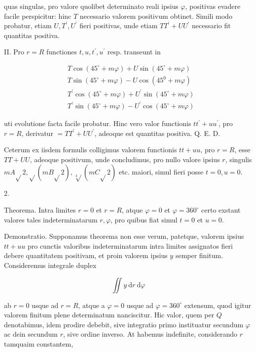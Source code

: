 \documentclass[twoside,12pt, showframe]{memoir}
\begin{document}
quas singulas, pro valore quolibet determinato reali ipsius \(\varphi\), positivas evadere facile perspicitur: hinc \(T\) necessario valorem positivum obtinet. Simili modo probatur, etiam \(U, T^{\prime}, U^{\prime}\) fieri positivas, unde etiam \(T T^{\prime}+U U^{\prime}\) necessario fit quantitas positiva.

II. Pro \(r=R\) functiones \(t, u, t^{\prime}, u^{\prime}\) resp. transeunt in

\[
\begin{aligned}
& T \cos \left(45^{\circ}+m \varphi\right)+U \sin \left(45^{\circ}+m \varphi\right) \\
& T \sin \left(45^{\circ}+m \varphi\right)-U \cos \left(45^{0}+m \varphi\right) \\
& T^{\prime} \cos \left(45^{\circ}+m \varphi\right)+U^{\prime} \sin \left(45^{\circ}+m \varphi\right) \\
& T^{\prime} \sin \left(45^{\circ}+m \varphi\right)-U^{\prime} \cos \left(45^{\circ}+m \varphi\right)
\end{aligned}
\]

uti evolutione facta facile probatur. Hinc vero valor functionis \(t t^{\prime}+u u^{\prime}\), pro \(r=R\), derivatur \(=T T^{\prime}+U U^{\prime}\), adeoque est quantitas positiva. Q. E. D.

Ceterum ex iisdem formulis colligimus valorem functionis \(t t+u u\), pro \(r=R\), esse \(T T+U U\), adeoque positivum, unde concludimus, pro nullo valore ipsius \(r\), singulis \(m A \sqrt{ } 2, \sqrt{ }(m B \sqrt{ } 2), \sqrt[3]{ }(m C \sqrt{ } 2)\) etc. maiori, simul fieri posse \(t=0, u=0\).

2.

Theorema. Intra limites \(r=0\) et \(r=R\), atque \(\varphi=0\) et \(\varphi=360^{\circ}\) certo exstant valores tales indeterminatarum \(r, \varphi\), pro quibus fiat simul \(t=0\) et \(u=0\).

Demonstratio. Supponamus theorema non esse verum, patetque, valorem ipsius \(t t+u u\) pro cunctis valoribus indeterminatarum intra limites assignatos fieri debere quantitatem positivam, et proin valorem ipsius \(y\) semper finitum. Consideremus integrale duplex

\[
\iint y \mathrm{~d} r \mathrm{~d} \varphi
\]

ab \(r=0\) usque ad \(r=R\), atque a \(\varphi=0\) usque ad \(\varphi=360^{\circ}\) extensum, quod igitur valorem finitum plene determinatum nanciscitur. Hic valor, quem
per \(Q\) denotabimus, idem prodire debebit, sive integratio primo instituatur secundum \(\varphi\) ac dein secundum \(r\), sive ordine inverso. At habemus indefinite, considerando \(r\) tamquaim constantem,
\end{document}
